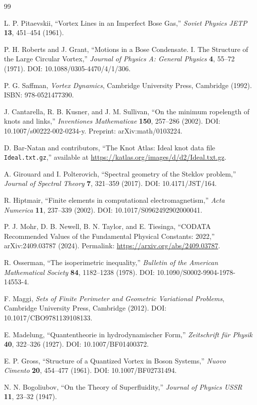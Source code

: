\documentclass[11pt]{article}
\begin{document}
\begin{thebibliography}{99}

L. P. Pitaevskii, ``Vortex Lines in an Imperfect Bose Gas,''
\emph{Soviet Physics JETP} \textbf{13}, 451--454 (1961).

P. H. Roberts and J. Grant, ``Motions in a Bose Condensate. I. The Structure of the Large Circular Vortex,''
\emph{Journal of Physics A: General Physics} \textbf{4}, 55--72 (1971).
DOI: 10.1088/0305-4470/4/1/306.

P. G. Saffman, \emph{Vortex Dynamics}, Cambridge University Press, Cambridge (1992).
ISBN: 978-0521477390.

J. Cantarella, R. B. Kusner, and J. M. Sullivan,
``On the minimum ropelength of knots and links,''
\emph{Inventiones Mathematicae} \textbf{150}, 257--286 (2002).
DOI: 10.1007/s00222-002-0234-y.
Preprint: arXiv:math/0103224.

D. Bar-Natan and contributors,
``The Knot Atlas: Ideal knot data file \texttt{Ideal.txt.gz},''
available at \url{https://katlas.org/images/d/d2/Ideal.txt.gz}.

A. Girouard and I. Polterovich,
``Spectral geometry of the Steklov problem,''
\emph{Journal of Spectral Theory} \textbf{7}, 321--359 (2017).
DOI: 10.4171/JST/164.

R. Hiptmair,
``Finite elements in computational electromagnetism,''
\emph{Acta Numerica} \textbf{11}, 237--339 (2002).
DOI: 10.1017/S0962492902000041.

P. J. Mohr, D. B. Newell, B. N. Taylor, and E. Tiesinga,
``CODATA Recommended Values of the Fundamental Physical Constants: 2022,''
arXiv:2409.03787 (2024).
Permalink: \url{https://arxiv.org/abs/2409.03787}.

R. Osserman,
``The isoperimetric inequality,''
\emph{Bulletin of the American Mathematical Society} \textbf{84},
1182--1238 (1978).
DOI: 10.1090/S0002-9904-1978-14553-4.

F. Maggi,
\emph{Sets of Finite Perimeter and Geometric Variational Problems},
Cambridge University Press, Cambridge (2012).
DOI: 10.1017/CBO9781139108133.

E. Madelung,
``Quantentheorie in hydrodynamischer Form,''
\emph{Zeitschrift f\"ur Physik} \textbf{40}, 322--326 (1927).
DOI: 10.1007/BF01400372.

E. P. Gross,
``Structure of a Quantized Vortex in Boson Systems,''
\emph{Nuovo Cimento} \textbf{20}, 454--477 (1961).
DOI: 10.1007/BF02731494.

N. N. Bogoliubov,
``On the Theory of Superfluidity,''
\emph{Journal of Physics USSR} \textbf{11}, 23--32 (1947).

\end{thebibliography}
\end{document}
